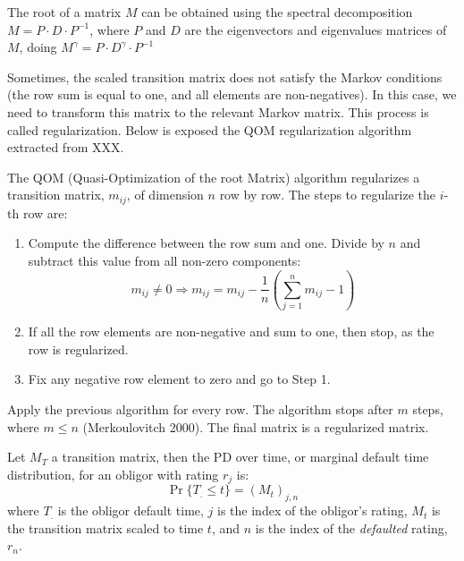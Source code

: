 \documentclass[11pt,fleqn]{book} %
\begin{document}
The root of a matrix $M$ can be obtained using the spectral decomposition
$M = P \cdot D \cdot P^{-1}$, where $P$ and $D$ are the eigenvectors and
eigenvalues matrices of $M$, doing $M^{\gamma} = P \cdot D^{\gamma} \cdot P^{-1}$

Sometimes, the scaled transition matrix does not satisfy the Markov conditions
(the row sum is equal to one, and all elements are non-negatives). In this case, 
we need to transform this matrix to the relevant Markov matrix. This process is 
called regularization. Below is exposed the QOM regularization algorithm 
extracted from XXX.

\begin{algorithm}
The QOM (Quasi-Optimization of the root Matrix) algorithm regularizes a 
transition matrix, $m_{ij}$, of dimension $n$ row by row. The steps to 
regularize the $i$-th row are:
\begin{enumerate}
\item Compute the difference between the row sum and one. 
Divide by $n$ and subtract this value from all non-zero components:
\begin{displaymath}
m_{ij} \ne 0 
\Longrightarrow 
m_{ij} = m_{ij} - \frac{1}{n} \left( \sum_{j=1}^{n} m_{ij} - 1\right)
\end{displaymath}
\item If all the row elements are non-negative and sum to one, 
then stop, as the row is regularized.
\item Fix any negative row element to zero and go to Step 1.
\end{enumerate}

Apply the previous algorithm for every row. The algorithm stops after $m$ 
steps, where $m \le n$ (Merkoulovitch 2000). The final matrix is a regularized
matrix. 
\end{algorithm}


\begin{proposition}
Let $M_T$ a transition matrix, then the PD over time, or marginal default
time distribution, for an obligor with rating $r_j$ is:
\begin{displaymath}
\Pr\{T_. \le t\} = \left( M_t \right)_{j, n}
\end{displaymath}
where $T_.$ is the obligor default time, $j$ is the index of the obligor's
rating, $M_t$ is the transition matrix scaled to time $t$, and $n$ is the 
index of the \emph{defaulted} rating, $r_n$.
\end{proposition}
\end{document}
